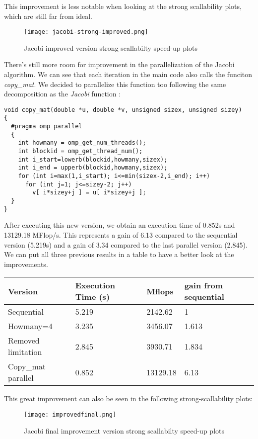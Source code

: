 
\justify
This improvement is less notable when looking at the strong scallability plots, which are still far from ideal.
\begin{figure}[h!]
    \centering
    \texttt{[image: jacobi-strong-improved.png]}
    \caption{Jacobi improved version strong scallabilty speed-up plots}
    \label{fig:strongimproved}
\end{figure}
\justify
There's still more room for improvement in the parallelization of the Jacobi algorithm. We can see that each iteration in the main code also calls the funciton \textit{copy\_mat}. We decided to parallelize this function too following the same decomposition as the \textit{Jacobi} function :

\begin{lstlisting}
void copy_mat(double *u, double *v, unsigned sizex, unsigned sizey)
{
  #pragma omp parallel
  {
    int howmany = omp_get_num_threads(); 
    int blockid = omp_get_thread_num();
    int i_start=lowerb(blockid,howmany,sizex);
    int i_end = upperb(blockid,howmany,sizex);
    for (int i=max(1,i_start); i<=min(sizex-2,i_end); i++)
      for (int j=1; j<=sizey-2; j++) 
        v[ i*sizey+j ] = u[ i*sizey+j ];
  }
}
\end{lstlisting}

\justify
After executing this new version, we obtain an execution time of 0.852s and 13129.18 MFlop/s. This represents a gain of 6.13 compared to the sequential version (5.219s) and a gain of 3.34 compared to the last parallel version (2.845). We can put all three previous results in a table to have a better look at the improvements.

\begin{table}[!h]
\begin{tabular}{|l|l|l|l|}
\hline
Version            & Execution Time (s) & Mflops   & gain from sequential \\ \hline
Sequential         & 5.219              & 2142.62  & 1                    \\ \hline
Howmany=4          & 3.235              & 3456.07  & 1.613                \\ \hline
Removed limitation & 2.845              & 3930.71  & 1.834                \\ \hline
Copy\_mat parallel & 0.852              & 13129.18 & 6.13                 \\ \hline
\end{tabular}
\end{table}
\clearpage
\justify
This great improvement can also be seen in the following strong-scallability plots:
\begin{figure}[h!]
    \centering
    \texttt{[image: improvedfinal.png]}
    \caption{Jacobi final improvement version strong scallabilty speed-up plots}
    \label{fig:strongimprovedfinal}
\end{figure}